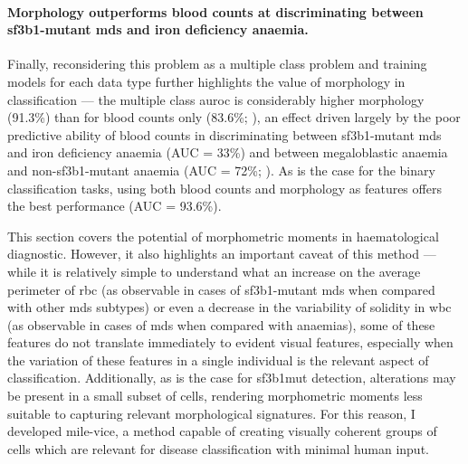 \paragraph{Morphology outperforms blood counts at discriminating between \ac{sf3b1}-mutant \ac{mds} and iron deficiency anaemia.} Finally, reconsidering this problem as a multiple class problem and training models for each data type further highlights the value of morphology in classification --- the multiple class \ac{auroc} is considerably higher morphology (91.3\%) than for blood counts only (83.6\%; ), an effect driven largely by the poor predictive ability of blood counts in discriminating between \ac{sf3b1}-mutant \ac{mds} and iron deficiency anaemia (AUC = 33\%) and between megaloblastic anaemia and non-\ac{sf3b1}-mutant anaemia (AUC = 72\%; ). As is the case for the binary classification tasks, using both blood counts and morphology as features offers the best performance (AUC = 93.6\%).

\begin{figure}[!ht]
    \label{fig:multiclass-auc}
\end{figure}

\begin{figure}[!ht]
    \label{fig:multiclass-auc-heatmap}
\end{figure}

This section covers the potential of morphometric moments in haematological diagnostic. However, it also highlights an important caveat of this method --- while it is relatively simple to understand what an increase on the average perimeter of \ac{rbc} (as observable in cases of \ac{sf3b1}-mutant \ac{mds} when compared with other \ac{mds} subtypes) or even a decrease in the variability of solidity in \ac{wbc} (as observable in cases of \ac{mds} when compared with anaemias), some of these features do not translate immediately to evident visual features, especially when the variation of these features in a single individual is the relevant aspect of classification. Additionally, as is the case for \ac{sf3b1}mut detection, alterations may be present in a small subset of cells, rendering morphometric moments less suitable to capturing relevant morphological signatures. For this reason, I developed \ac{mile-vice}, a method capable of creating visually coherent groups of cells which are relevant for disease classification with minimal human input.

